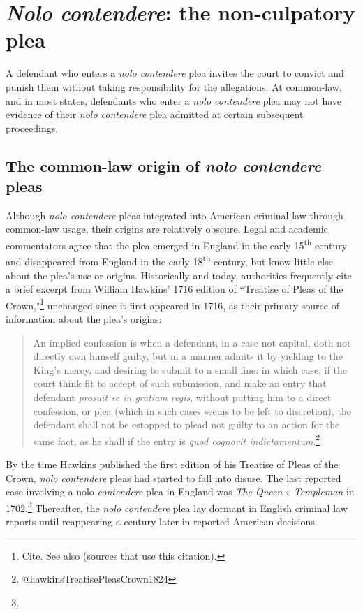 \section{\textit{Nolo contendere}: the non-culpatory plea}

A defendant who enters a \textit{nolo contendere} plea invites the court to convict and punish them without taking responsibility for the allegations. At common-law, and in most states, defendants who enter a \textit{nolo contendere} plea may not have evidence of their \textit{nolo contendere} plea admitted at certain subsequent proceedings. 

\subsection{The common-law origin of \textit{nolo contendere} pleas}

Although \textit{nolo contendere} pleas integrated into American criminal law through common-law usage, their origins are relatively obscure. Legal and academic commentators agree that the plea emerged in England in the early 15\textsuperscript{th} century and disappeared from England in the early 18\textsuperscript{th} century, but know little else about the plea's use or origins. Historically and today, authorities frequently cite a brief excerpt from William Hawkins' 1716 edition of ``Treatise of Pleas of the Crown,"\footnote{Cite. See also (sources that use this citation).} unchanged since it first appeared in 1716, as their primary source of information about the plea's origins:

\begin{quote}
\singlespacing
An implied confession is when a defendant, in a case not capital, doth not directly own himself guilty, but in a manner admits it by yielding to the King's mercy, and desiring to submit to a small fine: in which case, if the court think fit to accept of such submission, and make an entry that defendant \textit{prosuit se in gratiam regis}, without putting him to a direct confession, or plea (which in such cases seems to be left to discretion), the defendant shall not be estopped to plead not guilty to an action for the same fact, as he shall if the entry is \textit{quod cognovit indictamentum}.\footnote{@hawkinsTreatisePleasCrown1824}
\end{quote}

By the time Hawkins published the first edition of his Treatise of Pleas of the Crown, \textit{nolo contendere} pleas had started to fall into disuse. The last reported case involving a nolo\textit{ contendere} plea in England was \textit{The Queen v Templeman} in 1702.\footnote{} Thereafter, the \textit{nolo contendere} plea lay dormant in English criminal law reports until reappearing a century later in reported American decisions.

